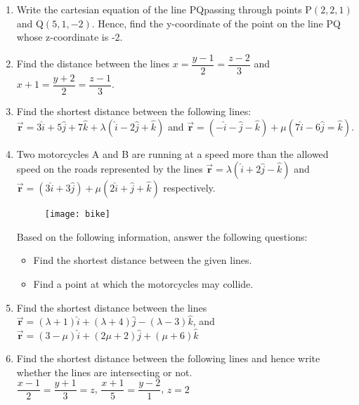\begin{enumerate}
\begin{itemize}
			\end{itemize}
		\vspace{4mm}
     \item Write the cartesian equation of the line PQ\@ passing through points P$(2,2,1)$ and Q$(5,1,-2)$. Hence, find the y-coordinate of the point on the line PQ whose z-coordinate is -2. 
				\vspace{4mm}
			\item Find the distance between the lines $x=\dfrac{y-1}{2}=\dfrac{z-2}{3}$ and $x+1=\dfrac{y+2}{2}=\dfrac{z-1}{3}$.
		\vspace{4mm}
\item Find the shortest distance between the following lines:
	\vspace{2mm}\\
	$\overrightarrow{\textbf{r}}=3\hat{i}+5\hat{j}+7\hat{k}+\lambda(\hat{i}-2\hat{j}+\hat{k})$ and $\overrightarrow{\textbf{r}}=(-\hat{i}-\hat{j}-\hat{k})+\mu(7\hat{i}-6\hat{j}=\hat{k})$.
	\vspace{4mm}
\item Two motorcycles A and B are running at a speed more than the allowed speed on the roads represented by the lines $\overrightarrow{\textbf{r}}=\lambda(\hat{i}+2\hat{j}-\hat{k})$ and $\overrightarrow{\textbf{r}}=(3\hat{i}+3\hat{j})+\mu(2\hat{i}+\hat{j}+\hat{k})$ respectively.\\
	\begin{figure}[H]
		\centering
		\texttt{[image: bike]}\\
	\end{figure}
	Based on the following information, answer the following questions:
	\begin{itemize}
		\item Find the shortest distance between the given lines.
		\item Find a point at which the motorcycles may collide.
	\end{itemize}
	\vspace{4mm}
\item Find the shortest distance between the lines\\\vspace{2mm}
	$\overrightarrow{\textbf{r}}=(\lambda+1)\hat{i}+(\lambda+4)\hat{j}-(\lambda-3)\hat{k}$, and\\
			\vspace{2mm}$\overrightarrow{\textbf{r}}=(3-\mu)\hat{i}+(2\mu+2)\hat{j}+(\mu+6)\hat{k}$
			\vspace{4mm}
\item Find the shortest distance between the following lines and hence write whether the lines are intersecting or not.\vspace{2mm}\\
	$\dfrac{x-1}{2}=\dfrac{y+1}{3}=z$, $\dfrac{x+1}{5}=\dfrac{y-2}{1}$, $z=2$
\end{enumerate}
%
